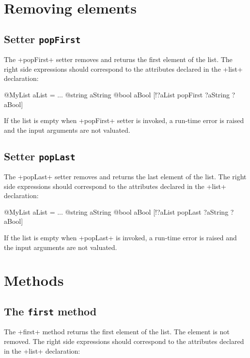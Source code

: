 \section{Removing elements}

\subsection{Setter \texttt{popFirst}}


The \ggs+popFirst+ setter removes and returns the first element of the list. The right side expressions should correspond to the attributes declared in the \ggs+list+ declaration:

\begin{galgas}
@MyList aList = ...
@string aString
@bool aBool
[!?aList popFirst ?aString ?aBool]
\end{galgas}

If the list is empty when \ggs+popFirst+ setter is invoked, a run-time error is raised and the input arguments are not valuated.

\subsection{Setter \texttt{popLast}}


The \ggs+popLast+ setter removes and returns the last element of the list. The right side expressions should correspond to the attributes declared in the \ggs+list+ declaration:

\begin{galgas}
@MyList aList = ...
@string aString
@bool aBool
[!?aList popLast ?aString ?aBool]
\end{galgas}

If the list is empty when \ggs+popLast+ is invoked, a run-time error is raised and the input arguments are not valuated.

\section{Methods}

\subsection{The \texttt{first} method}

The \ggs+first+ method returns the first element of the list. The element is not removed. The right side expressions should correspond to the attributes declared in the \ggs+list+ declaration:

